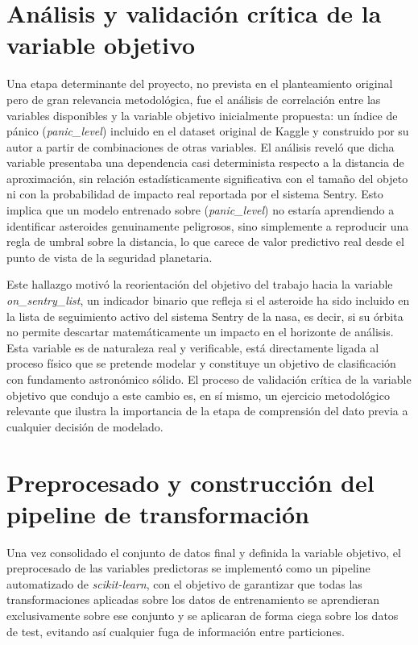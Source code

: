 \documentclass[12pt]{report} %
\begin{document}
\section{Análisis y validación crítica de la variable objetivo}
 
Una etapa determinante del proyecto, no prevista en el planteamiento original pero de gran relevancia metodológica, fue el análisis de correlación entre las variables disponibles y la variable objetivo inicialmente propuesta: un índice de pánico (\textit{panic\_level}) incluido en el dataset original de Kaggle y construido por su autor a partir de combinaciones de otras variables. El análisis reveló que dicha variable presentaba una dependencia casi determinista respecto a la distancia de aproximación, sin relación estadísticamente significativa con el tamaño del objeto ni con la probabilidad de impacto real reportada por el sistema Sentry. Esto implica que un modelo entrenado sobre (\textit{panic\_level}) no estaría aprendiendo a identificar asteroides genuinamente peligrosos, sino simplemente a reproducir una regla de umbral sobre la distancia, lo que carece de valor predictivo real desde el punto de vista de la seguridad planetaria.
 
Este hallazgo motivó la reorientación del objetivo del trabajo hacia la variable \textit{on\_sentry\_list}, un indicador binario que refleja si el asteroide ha sido incluido en la lista de seguimiento activo del sistema Sentry de la \gls{nasa}, es decir, si su órbita no permite descartar matemáticamente un impacto en el horizonte de análisis. Esta variable es de naturaleza real y verificable, está directamente ligada al proceso físico que se pretende modelar y constituye un objetivo de clasificación con fundamento astronómico sólido. El proceso de validación crítica de la variable objetivo que condujo a este cambio es, en sí mismo, un ejercicio metodológico relevante que ilustra la importancia de la etapa de comprensión del dato previa a cualquier decisión de modelado.
 
\section{Preprocesado y construcción del pipeline de transformación}
 
Una vez consolidado el conjunto de datos final y definida la variable objetivo, el preprocesado de las variables predictoras se implementó como un pipeline automatizado de \textit{scikit-learn}, con el objetivo de garantizar que todas las transformaciones aplicadas sobre los datos de entrenamiento se aprendieran exclusivamente sobre ese conjunto y se aplicaran de forma ciega sobre los datos de test, evitando así cualquier fuga de información entre particiones.
 
\end{document}
